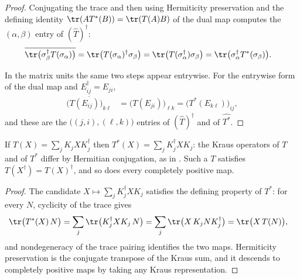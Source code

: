 \begin{proof}\leanok
    Conjugating the trace and then using Hermiticity preservation and the
    defining identity $\tr(AT^*(B))=\tr(T(A)B)$ of the dual map computes the
    $(\alpha,\beta)$ entry of $(\widehat T)^\dagger$:
    \begin{align}
        \overline{\tr\bigl(\sigma_\beta^\dagger T(\sigma_\alpha)\bigr)}
        &= \tr\bigl(T(\sigma_\alpha)^\dagger\sigma_\beta\bigr)
         = \tr\bigl(T(\sigma_\alpha^\dagger)\sigma_\beta\bigr)
         = \tr\bigl(\sigma_\alpha^\dagger T^*(\sigma_\beta)\bigr).
    \end{align}

    In the matrix units the same two steps appear entrywise. For the entrywise
    form of the dual map and $E_{ij}^\dagger=E_{ji}$,
    \begin{align}
        \overline{\bigl(T(E_{ij})\bigr)_{k\ell}}
        &= \bigl(T(E_{ji})\bigr)_{\ell k}
         = \bigl(T^*(E_{k\ell})\bigr)_{ij},
    \end{align}
    and these are the $\bigl((j,i),(\ell,k)\bigr)$ entries of
    $(\widehat T)^\dagger$ and of $\widehat{T^*}$.
\end{proof}

\begin{lemma}
    \label{lem:trace_adjoint_of_kraus}
    \leanok
    If $T(X)=\sum_j K_j X K_j^\dagger$ then $T^*(X)=\sum_j K_j^\dagger X K_j$: the
    Kraus operators of $T$ and of $T^*$ differ by Hermitian conjugation, as in
    \cite[Section~2.2, after Proposition~2.4]{Wolf2012Quantum}. Such a $T$
    satisfies $T(X^\dagger)=T(X)^\dagger$, and so does every completely positive
    map.
\end{lemma}

\begin{proof}\leanok
    The candidate $X\mapsto\sum_jK_j^\dagger XK_j$ satisfies the defining
    property of $T^*$: for every $N$, cyclicity of the trace gives
    \begin{align}
        \tr\bigl(T^*(X)\,N\bigr)
        &= \sum_j\tr\bigl(K_j^\dagger XK_j\,N\bigr)
         = \sum_j\tr\bigl(X\,K_jNK_j^\dagger\bigr)
         = \tr\bigl(X\,T(N)\bigr),
    \end{align}
    and nondegeneracy of the trace pairing identifies the two maps. Hermiticity
    preservation is the conjugate transpose of the Kraus sum, and it descends to
    completely positive maps by taking any Kraus representation.
\end{proof}

